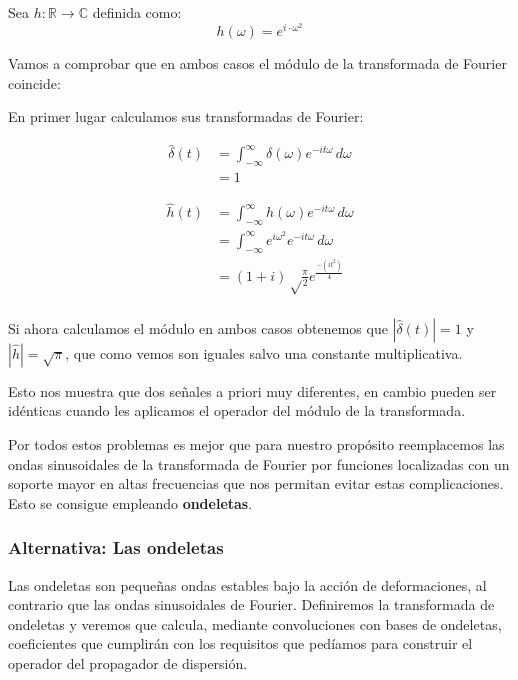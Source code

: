 \begin{definicion}
  Sea $h:\mathbb{R} \rightarrow \mathbb{C}$ definida como:
  $$h(\omega)=e^{i \cdot \omega^2}$$
\end{definicion}

\medskip

\noindent Vamos a comprobar que en ambos casos el módulo de la transformada de Fourier coincide:

\noindent En primer lugar calculamos sus transformadas de Fourier: 

\begin{align*}
  \widehat{\delta}(t)& =\int_{- \infty}^{\infty} \delta(\omega) e^{-i t \omega }  \,d\omega \\
& = 1
\end{align*}

\begin{align*}
  \widehat{h}(t)& =\int_{- \infty}^{\infty} h(\omega) e^{-i t \omega }  \,d\omega \\
& =\int_{- \infty}^{\infty} e^{i \omega^2} e^{-i t \omega }  \,d\omega \\
& =(1 + i) \sqrt\frac{\pi}{2} e^{\frac{-(i t^2)}{4}}\\
\end{align*}


\noindent Si ahora calculamos el módulo en ambos casos obtenemos que $|\widehat{\delta}(t)|=1$ y $|\widehat{h}|=\sqrt{\pi}$, que como vemos son iguales salvo una constante multiplicativa. 

\medskip

\noindent Esto nos muestra que dos señales a priori muy diferentes, en cambio pueden ser idénticas cuando les aplicamos el operador del módulo de la transformada.

\medskip

\noindent Por todos estos problemas es mejor que para nuestro propósito reemplacemos las ondas sinusoidales de la transformada de Fourier por funciones localizadas con un soporte mayor en altas frecuencias que nos permitan evitar estas complicaciones. Esto se consigue empleando \textbf{ondeletas}. 

\medskip

\subsubsection{Alternativa: Las ondeletas}

\noindent Las ondeletas \cite{MallatWavelets} son pequeñas ondas estables bajo la acción de deformaciones, al contrario que las ondas sinusoidales de Fourier. Definiremos la transformada de ondeletas y veremos que calcula, mediante convoluciones con bases de ondeletas, coeficientes que cumplirán con los requisitos que pedíamos para construir el operador del propagador de dispersión.


